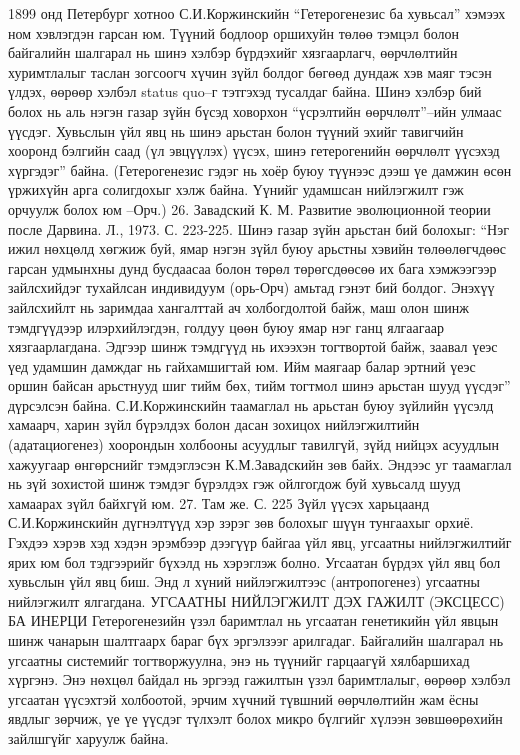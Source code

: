 1899 онд Петербург хотноо С.И.Коржинскийн “Гетерогенезис ба хувьсал” хэмээх ном хэвлэгдэн гарсан юм. Түүний бодлоор оршихуйн төлөө тэмцэл болон байгалийн шалгарал нь шинэ хэлбэр бүрдэхийг хязгаарлагч, өөрчлөлтийн хуримтлалыг таслан зогсоогч хүчин зүйл болдог бөгөөд дундаж хэв маяг тэсэн үлдэх, өөрөөр хэлбэл status quo–г тэтгэхэд тусалдаг байна. Шинэ хэлбэр бий болох нь аль нэгэн газар зүйн бүсэд ховорхон “үсрэлтийн өөрчлөлт”–ийн улмаас үүсдэг. Хувьслын үйл явц нь шинэ арьстан болон түүний эхийг тавигчийн хооронд бэлгийн саад (үл эвцүүлэх) үүсэх, шинэ гетерогенийн өөрчлөлт үүсэхэд хүргэдэг” байна. (Гетерогенезис гэдэг нь хоёр буюу түүнээс дээш үе дамжин өсөн үржихүйн арга солигдохыг хэлж байна. Үүнийг удамшсан нийлэгжилт гэж орчуулж болох юм –Орч.) 26. Завадский К. М. Развитие эволюционной теории после Дарвина. Л., 1973. С. 223-225.
Шинэ газар зүйн арьстан бий болохыг: “Нэг ижил нөхцөлд хөгжиж буй, ямар нэгэн зүйл буюу арьстны хэвийн төлөөлөгчдөөс гарсан удмынхны дунд бусдаасаа болон төрөл төрөгсдөөсөө их бага хэмжээгээр зайлсхийдэг тухайлсан индивидуум (орь-Орч) амьтад гэнэт бий болдог. Энэхүү зайлсхийлт нь заримдаа хангалттай ач холбогдолтой байж, маш олон шинж тэмдгүүдээр илэрхийлэгдэн, голдуу цөөн буюу ямар нэг ганц ялгаагаар хязгаарлагдана. Эдгээр шинж тэмдгүүд нь ихээхэн тогтвортой байж, заавал үеэс үед удамшин дамждаг нь гайхамшигтай юм. Ийм маягаар балар эртний үеэс оршин байсан арьстнууд шиг тийм бөх, тийм тогтмол шинэ арьстан шууд үүсдэг” дүрсэлсэн байна.
С.И.Коржинскийн таамаглал нь арьстан буюу зүйлийн үүсэлд хамаарч, харин зүйл бүрэлдэх болон дасан зохицох нийлэгжилтийн (адатациогенез) хоорондын холбооны асуудлыг тавилгүй, зүйд нийцэх асуудлын хажуугаар өнгөрснийг тэмдэглэсэн К.М.Завадскийн зөв байх. Эндээс уг таамаглал нь зүй зохистой шинж тэмдэг бүрэлдэх гэж ойлгогдож буй хувьсалд шууд хамаарах зүйл байхгүй юм. 27. Там же. С. 225
Зүйл үүсэх харьцаанд С.И.Коржинскийн дүгнэлтүүд хэр зэрэг зөв болохыг шүүн тунгаахыг орхиё. Гэхдээ хэрэв хэд хэдэн эрэмбээр дээгүүр байгаа үйл явц, угсаатны нийлэгжилтийг ярих юм бол тэдгээрийг бүхэлд нь хэрэглэж болно. Угсаатан бүрдэх үйл явц бол хувьслын үйл явц биш. Энд л хүний нийлэгжилтээс (антропогенез) угсаатны нийлэгжилт ялгагдана.
УГСААТНЫ НИЙЛЭГЖИЛТ ДЭХ ГАЖИЛТ (ЭКСЦЕСС) БА ИНЕРЦИ
Гетерогенезийн үзэл баримтлал нь угсаатан генетикийн үйл явцын шинж чанарын шалтгаарх бараг бүх эргэлзээг арилгадаг. Байгалийн шалгарал нь угсаатны системийг тогтворжуулна, энэ нь түүнийг гарцаагүй хялбаршихад хүргэнэ. Энэ нөхцөл байдал нь эргээд гажилтын үзэл баримтлалыг, өөрөөр хэлбэл угсаатан үүсэхтэй холбоотой, эрчим хүчний түвшний өөрчлөлтийн жам ёсны явдлыг зөрчиж, үе үе үүсдэг түлхэлт болох микро бүлгийг хүлээн зөвшөөрөхийн зайлшгүйг харуулж байна.
